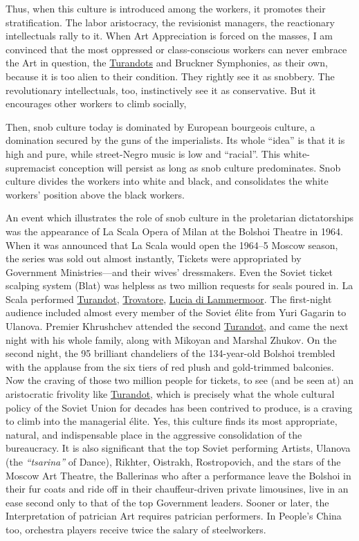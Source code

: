 Thus, when this culture is introduced among the workers, it promotes their stratification. The labor aristocracy, the revisionist managers, the reactionary intellectuals rally to it. When Art Appreciation is forced on the masses, I am convinced that the most oppressed or class-conscious workers can never embrace the Art in question, the \uline{Turandots} and Bruckner Symphonies, as their own, because it is too alien to their condition. They rightly see it as snobbery. The revolutionary intellectuals, too, instinctively see it as conservative. But it encourages other workers to climb socially, 

Then, snob culture today is dominated by European bourgeois culture, a domination secured by the guns of the imperialists. Its whole \enquote{idea} is that it is high and pure, while street-Negro music is low and \enquote{racial}. This white-supremacist conception will persist as long as snob culture predominates. Snob culture divides the workers into white and black, and consolidates the white workers' position above the black workers. 

An event which illustrates the role of snob culture in the proletarian dictatorships was the appearance of La Scala Opera of Milan at the Bolshoi Theatre in 1964. When it was announced that La Scala would open the 1964--5 Moscow season, the series was sold out almost instantly, Tickets were appropriated by Government Ministries---and their wives' dressmakers. Even the Soviet ticket scalping system (Blat) was helpless as two million requests for seals poured in. La Scala performed \uline{Turandot}, \uline{Trovatore}, \uline{Lucia di Lammermoor}. The first-night audience included almost every member of the Soviet \'{e}lite from Yuri Gagarin to Ulanova. Premier Khrushchev attended the second \uline{Turandot}, and came the next night with his whole family, along with Mikoyan and Marshal Zhukov. On the second night, the 95 brilliant chandeliers of the 134-year-old Bolshoi trembled with the applause from the six tiers of red plush and gold-trimmed balconies. Now the craving of those two million people for tickets, to see (and be seen at) an aristocratic frivolity like \uline{Turandot}, which is precisely what the whole cultural policy of the Soviet Union for decades has been contrived to produce, is a craving to climb into the managerial \'{e}lite. Yes, this culture finds its most appropriate, natural, and indispensable place in the aggressive consolidation of the bureaucracy. It is also significant that the top Soviet performing Artists, Ulanova (the \emph{\enquote{tsarina}} of Dance), Rikhter, Oistrakh, Rostropovich, and the stars of the Moscow Art Theatre, the Ballerinas who after a performance leave the Bolshoi in their fur coats and ride off in their chauffeur-driven private limousines, live in an ease second only to that of the top Government leaders. Sooner or later, the Interpretation of patrician Art requires patrician performers. In People's China too, orchestra players receive twice the salary of steelworkers. 

